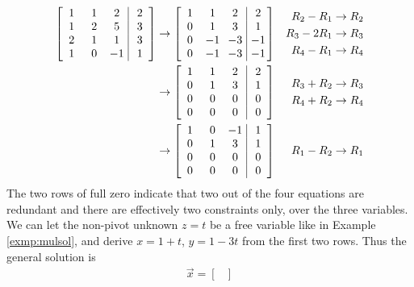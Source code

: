 \begin{solution}
\begin{align*}
\left[\begin{array}{@{\;}wc{10pt}wc{10pt}wc{10pt}|wc{10pt}@{\;}}
1 & 1 & 2 & 2 \\
1 & 2 & 5 & 3 \\
2 & 1 & 1 & 3 \\
1 & 0 & -1 & 1
\end{array}\right] 
& \to 
\left[\begin{array}{@{\;}wc{10pt}wc{10pt}wc{10pt}|wc{10pt}@{\;}}
1 & 1 & 2 & 2 \\
0 & 1 & 3 & 1 \\
0 & -1 & -3 & -1\\
0 & -1 & -3 & -1
\end{array}\right] 
& \begin{aligned}
R_2 - R_1 &\to R_2\\
R_3 - 2R_1 &\to R_3 \\
R_4 - R_1 &\to R_4
\end{aligned}\\ 
& \to 
\left[\begin{array}{@{\;}wc{10pt}wc{10pt}wc{10pt}|wc{10pt}@{\;}}
1 & 1 & 2 & 2 \\
0 & 1 & 3 & 1 \\
0 & 0 & 0 & 0 \\
0 & 0 & 0 & 0
\end{array}\right] 
& \begin{aligned}
R_3 + R_2 &\to R_3\\
R_4 + R_2 &\to R_4    
\end{aligned} \\
& \to 
\left[\begin{array}{@{\;}wc{10pt}wc{10pt}wc{10pt}|wc{10pt}@{\;}}
1 & 0 & -1 & 1 \\
0 & 1 & 3 & 1 \\
0 & 0 & 0 & 0 \\
0 & 0 & 0 & 0
\end{array}\right] 
& R_1- R_2 \to R_1 
\end{align*}
The two rows of full zero indicate that two out of the four equations are redundant and there are effectively two constraints only, over the three variables. We can let the non-pivot unknown $z = t$ be a free variable like in Example \ref{exmp:mulsol}, and derive $x = 1+t$, $y = 1-3t$ from the first two rows. Thus the general solution is
\begin{align*}
\vec{x} = 
\begin{bmatrix}

\end{bmatrix}
\end{align*}
\end{solution}
